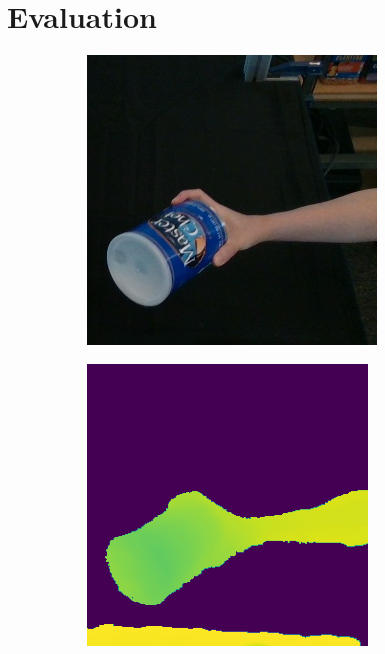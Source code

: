 \section{Evaluation}
\label{sec:evaluation}

\begin{figure}[h!]
  \centering
  
  \begin{subfigure}[b]{0.16\linewidth}
    \includegraphics[width=0.98\linewidth]{figs/1000_rgb}
  \end{subfigure}
  \begin{subfigure}[b]{0.16\linewidth}
    \includegraphics[width=0.98\linewidth]{figs/1000_depth2}

\end{subfigure}
\end{figure}
